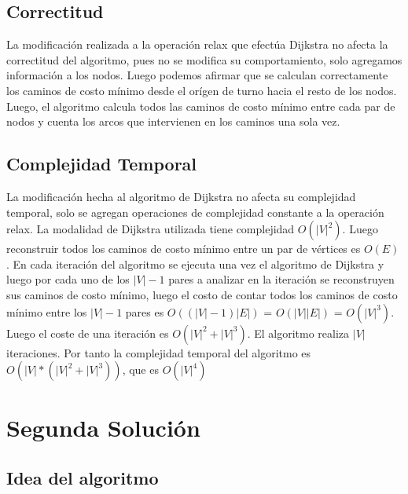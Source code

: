 \documentclass[article]{llncs}
\begin{document}
\subsection{Correctitud}

La modificaci\'on realizada a la operaci\'on relax que efect\'ua Dijkstra no afecta la correctitud 
del algoritmo, pues no se modifica su comportamiento, solo agregamos informaci\'on a los nodos. Luego 
podemos afirmar que se calculan correctamente los caminos de costo m\'inimo desde el or\'igen de turno 
hacia el resto de los nodos. Luego, el algoritmo calcula todos las caminos de costo m\'inimo entre cada 
par de nodos y cuenta los arcos que intervienen en los caminos una sola vez. 

\subsection{Complejidad Temporal}

La modificaci\'on hecha al algoritmo de Dijkstra no afecta su complejidad temporal, solo se agregan operaciones de complejidad 
constante a la operaci\'on relax.
La modalidad de Dijkstra utilizada tiene complejidad $O(|V|^2)$. Luego reconstruir todos los caminos de costo m\'inimo 
entre un par de v\'ertices es $O(E)$. En cada iteraci\'on del algoritmo se ejecuta una vez el algoritmo 
de Dijkstra y luego por cada uno de los $|V| - 1$ pares a analizar en la iteraci\'on se reconstruyen sus 
caminos de costo m\'inimo, luego el costo de contar todos los caminos de costo m\'inimo entre los $|V| - 1$
pares es $O((|V|-1)|E|)$ = $O(|V||E|)$ = $O(|V|^3)$. Luego el coste de una iteraci\'on es $O(|V|^2 + |V|^3)$. 
El algoritmo realiza $|V|$ iteraciones. Por tanto la complejidad temporal del algoritmo es $O(|V|*(|V|^2 + |V|^3))$, 
que es $O(|V|^4)$

\section{Segunda Solución}

\subsection{Idea del algoritmo}
\end{document}
